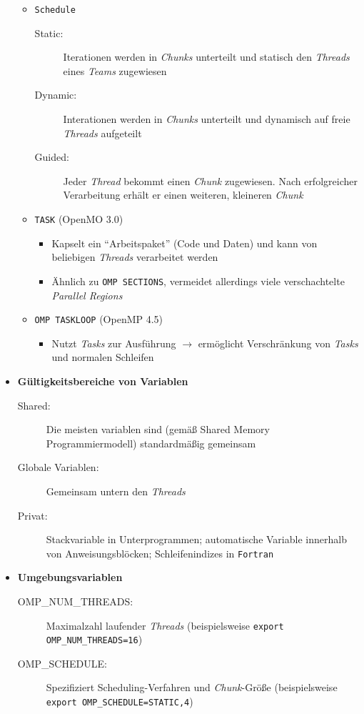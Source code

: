 \begin{itemize}
\begin{itemize}
		\item \texttt{Schedule}
		\begin{description}
			\item[Static:] Iterationen werden in \textit{Chunks} unterteilt und statisch den \textit{Threads} eines \textit{Teams} zugewiesen
			\item[Dynamic:] Interationen werden in \textit{Chunks} unterteilt und dynamisch auf freie \textit{Threads} aufgeteilt
			\item[Guided:] Jeder \textit{Thread} bekommt einen \textit{Chunk} zugewiesen. Nach erfolgreicher Verarbeitung erhält er einen weiteren, kleineren \textit{Chunk}
		\end{description}
		\item \texttt{TASK} (OpenMO 3.0)
		\begin{itemize}
			\item Kapselt ein "`Arbeitspaket"' (Code und Daten) und kann von beliebigen \textit{Threads} verarbeitet werden
			\item Ähnlich zu \texttt{OMP SECTIONS}, vermeidet allerdings viele verschachtelte \textit{Parallel Regions}
		\end{itemize}
		\item \texttt{OMP TASKLOOP} (OpenMP 4.5)
		\begin{itemize}
			\item Nutzt \textit{Tasks} zur Ausführung \(\rightarrow\) ermöglicht Verschränkung von \textit{Tasks} und normalen Schleifen
		\end{itemize}
	\end{itemize}
	\item \textbf{Gültigkeitsbereiche von Variablen}
	\begin{description}
		\item[Shared:] Die meisten variablen sind (gemäß Shared Memory Programmiermodell) standardmäßig gemeinsam
		\item[Globale Variablen:] Gemeinsam untern den \textit{Threads}
		\item[Privat:] Stackvariable in Unterprogrammen; automatische Variable innerhalb von Anweisungsblöcken; Schleifenindizes in \texttt{Fortran}
	\end{description}
	\item \textbf{Umgebungsvariablen}
	\begin{description}
		\item[OMP\_NUM\_THREADS:] Maximalzahl laufender \textit{Threads} (beispielsweise \texttt{export OMP\_NUM\_THREADS=16})
		\item[OMP\_SCHEDULE:] Spezifiziert Scheduling-Verfahren und \textit{Chunk}-Größe (beispielsweise \texttt{export OMP\_SCHEDULE=\dq STATIC,4\dq})
	\end{description}
\end{itemize}


